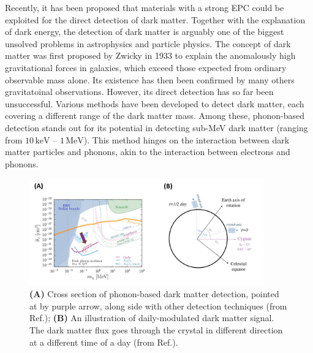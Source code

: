 \documentclass[11pt]{article}
\begin{document}
Recently, it has been proposed that materials with a strong EPC could be exploited for the direct detection of dark matter.
Together with the explanation of dark energy, the detection of dark matter is arguably one of the biggest unsolved problems in astrophysics and particle physics.
The concept of dark matter was first proposed by Zwicky in 1933\cite{andernach_english_2017} to explain the anomalously high gravitational forces in galaxies, which exceed those expected from ordinary observable mass alone. Its existence has then been confirmed by many others gravitatoinal observations.
However, its direct detection has so far been unsuccessful.
Various methods have been developed to detect dark matter\cite{bergstrom_non-baryonic_2000}, each covering a different range of the dark matter mass\cite{vogel_dark_2014,essig_first_2012,davidson_updated_2000}. Among these, phonon-based detection stands out for its potential in detecting sub-MeV dark matter (ranging from $ 10\,\mathrm{keV}$ -- $1\,\mathrm{MeV}$). This method hinges on the interaction between dark matter particles and phonons, akin to the interaction between electrons and phonons\cite{griffin_directional_2018}. 
%
\begin{figure}[t]
    \centering
    \includegraphics[width=0.9\textwidth]{figures/third_figure.jpg}
    \caption{\textbf{(A)} Cross section of phonon-based dark matter detection, pointed at by purple arrow, along side with other detection techniques (from Ref.\cite{griffin_directional_2018}); \textbf{(B)} An illustration of daily-modulated dark matter signal. The dark matter flux goes through the crystal in different direction at a different time of a day (from Ref.\cite{griffin_directional_2018}).}
    \label{third_figure}
\end{figure}
\end{document}
